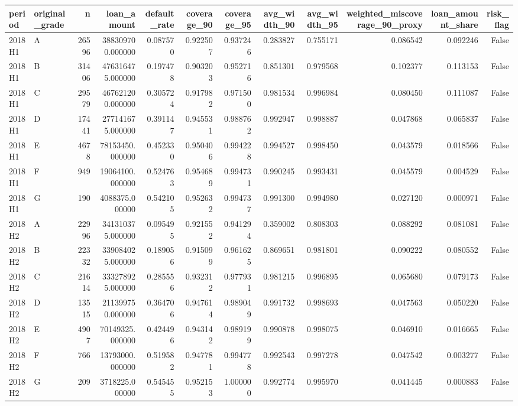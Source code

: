 \begin{tabular}{llrrrrrrrrrr}
\toprule
period & original\_grade & n & loan\_amount & default\_rate & coverage\_90 & coverage\_95 & avg\_width\_90 & avg\_width\_95 & weighted\_miscoverage\_90\_proxy & loan\_amount\_share & risk\_flag \\
\midrule
2018H1 & A & 26596 & 388309700.000000 & 0.087570 & 0.922507 & 0.937246 & 0.283827 & 0.755171 & 0.086542 & 0.092246 & False \\
2018H1 & B & 31406 & 476316475.000000 & 0.197478 & 0.903203 & 0.952716 & 0.851301 & 0.979568 & 0.102377 & 0.113153 & False \\
2018H1 & C & 29579 & 467621200.000000 & 0.305724 & 0.917982 & 0.971500 & 0.981534 & 0.996984 & 0.080450 & 0.111087 & False \\
2018H1 & D & 17441 & 277141675.000000 & 0.391147 & 0.945531 & 0.988762 & 0.992947 & 0.998887 & 0.047868 & 0.065837 & False \\
2018H1 & E & 4678 & 78153450.000000 & 0.452330 & 0.950406 & 0.994228 & 0.994527 & 0.998450 & 0.043579 & 0.018566 & False \\
2018H1 & F & 949 & 19064100.000000 & 0.524763 & 0.954689 & 0.994731 & 0.990245 & 0.993431 & 0.045579 & 0.004529 & False \\
2018H1 & G & 190 & 4088375.000000 & 0.542105 & 0.952632 & 0.994737 & 0.991300 & 0.994980 & 0.027120 & 0.000971 & False \\
2018H2 & A & 22996 & 341310375.000000 & 0.095495 & 0.921552 & 0.941294 & 0.359002 & 0.808303 & 0.088292 & 0.081081 & False \\
2018H2 & B & 22332 & 339084025.000000 & 0.189056 & 0.915099 & 0.961625 & 0.869651 & 0.981801 & 0.090222 & 0.080552 & False \\
2018H2 & C & 21614 & 333278925.000000 & 0.285556 & 0.932312 & 0.977931 & 0.981215 & 0.996895 & 0.065680 & 0.079173 & False \\
2018H2 & D & 13515 & 211399750.000000 & 0.364706 & 0.947614 & 0.989049 & 0.991732 & 0.998693 & 0.047563 & 0.050220 & False \\
2018H2 & E & 4907 & 70149325.000000 & 0.424496 & 0.943142 & 0.989199 & 0.990878 & 0.998075 & 0.046910 & 0.016665 & False \\
2018H2 & F & 766 & 13793000.000000 & 0.519582 & 0.947781 & 0.994778 & 0.992543 & 0.997278 & 0.047542 & 0.003277 & False \\
2018H2 & G & 209 & 3718225.000000 & 0.545455 & 0.952153 & 1.000000 & 0.992774 & 0.995970 & 0.041445 & 0.000883 & False \\

\end{tabular}
